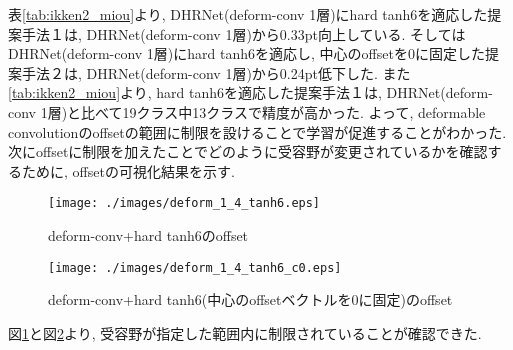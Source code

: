 表\ref{tab:ikken2_miou}より, DHRNet(deform-conv 1層)にhard tanh6を適応した提案手法１は, DHRNet(deform-conv 1層)から0.33pt向上している. そしてはDHRNet(deform-conv 1層)にhard tanh6を適応し, 中心のoffsetを0に固定した提案手法２は, DHRNet(deform-conv 1層)から0.24pt低下した. また\ref{tab:ikken2_miou}より, hard tanh6を適応した提案手法１は, DHRNet(deform-conv 1層)と比べて19クラス中13クラスで精度が高かった. よって, deformable convolutionのoffsetの範囲に制限を設けることで学習が促進することがわかった. 
次にoffsetに制限を加えたことでどのように受容野が変更されているかを確認するために, offsetの可視化結果を示す.

\begin{figure}[H]
    \centering
    \texttt{[image: ./images/deform\_1\_4\_tanh6.eps]}
    \caption{deform-conv+hard tanh6のoffset}
    \label{fig:deformtanh6}
\end{figure}
\begin{figure}[H]
    \centering
    \texttt{[image: ./images/deform\_1\_4\_tanh6\_c0.eps]}
    \caption{deform-conv+hard tanh6(中心のoffsetベクトルを0に固定)のoffset}
    \label{fig:deformtanh6c0}
\end{figure}

図\ref{fig:deformtanh6}と図\ref{fig:deformtanh6c0}より, 受容野が指定した範囲内に制限されていることが確認できた.